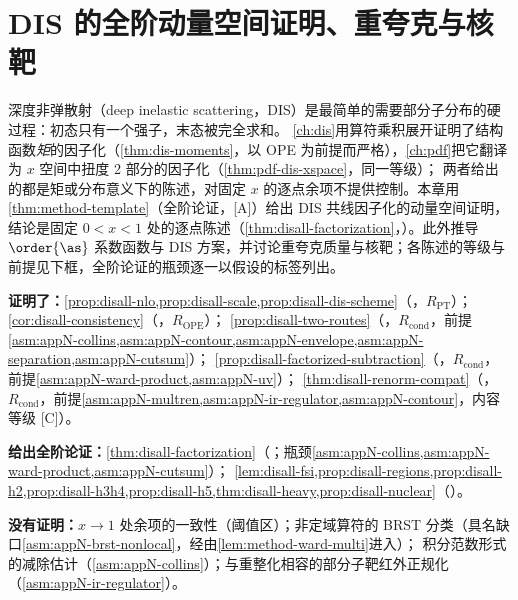 \chapter{DIS 的全阶动量空间证明、重夸克与核靶}\label{ch:disall}

深度非弹散射（deep inelastic scattering，DIS）是最简单的需要部分子分布的硬过程：初态只有一个强子，末态被完全求和。
\cref{ch:dis}用算符乘积展开证明了结构函数\emph{矩}的因子化（\cref{thm:dis-moments}，以 OPE 为前提而严格），\cref{ch:pdf}把它翻译为 $x$ 空间中扭度 2 部分的因子化（\cref{thm:pdf-dis-xspace}，同一等级）；
两者给出的都是矩或分布意义下的陈述，对固定 $x$ 的逐点余项不提供控制。本章用\cref{thm:method-template}（全阶论证，[A]）给出 DIS 共线因子化的动量空间证明，
结论是固定 $0<x<1$ 处的逐点陈述（\cref{thm:disall-factorization}，\tagA）。此外推导 $\order{\as}$ 系数函数与 DIS 方案，并讨论重夸克质量与核靶；各陈述的等级与前提见下框，全阶论证的瓶颈逐一以假设的标签列出。

\begin{tcolorbox}[enhanced,breakable,title=本章证明了什么／没有证明什么,fonttitle=\bfseries,
  colback=gray!3!white,colframe=gray!55!black,boxrule=0.6pt,arc=2pt,
  left=5pt,right=5pt,top=3pt,bottom=3pt,before skip=6pt,after skip=6pt]
\textbf{证明了：}\cref{prop:disall-nlo,prop:disall-scale,prop:disall-dis-scheme}（\tagR，$R_{\mathrm{PT}}$）；\cref{cor:disall-consistency}（\tagR，$R_{\mathrm{OPE}}$）；
\cref{prop:disall-two-routes}（\tagR，$R_{\mathrm{cond}}$，前提\cref{asm:appN-collins,asm:appN-contour,asm:appN-envelope,asm:appN-separation,asm:appN-cutsum}）；
\cref{prop:disall-factorized-subtraction}（\tagR，$R_{\mathrm{cond}}$，前提\cref{asm:appN-ward-product,asm:appN-uv}）；
\cref{thm:disall-renorm-compat}（\tagR，$R_{\mathrm{cond}}$，前提\cref{asm:appN-multren,asm:appN-ir-regulator,asm:appN-contour}，内容等级 [C]）。\par
\textbf{给出全阶论证：}\cref{thm:disall-factorization}（\tagA；瓶颈\cref{asm:appN-collins,asm:appN-ward-product,asm:appN-cutsum}）；
\cref{lem:disall-fsi,prop:disall-regions,prop:disall-h2,prop:disall-h3h4,prop:disall-h5,thm:disall-heavy,prop:disall-nuclear}（\tagA）。\par
\textbf{没有证明：}$x\to1$ 处余项的一致性（阈值区）；非定域算符的 BRST 分类（具名缺口\cref{asm:appN-brst-nonlocal}，经由\cref{lem:method-ward-multi}进入）；
积分范数形式的减除估计（\cref{asm:appN-collins}）；与重整化相容的部分子靶红外正规化（\cref{asm:appN-ir-regulator}）。
\end{tcolorbox}

